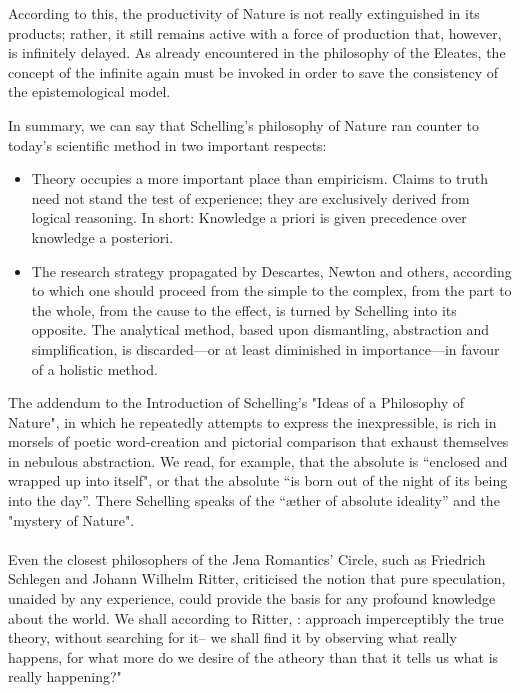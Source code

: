 \documentclass[10pt,a4paper]{article}
\newcounter{theo}
\begin{document}
                According to this, the productivity of Nature is not really extinguished in its products; rather, it still remains active with a force of production that, however, is infinitely delayed. As already encountered in the philosophy of the Eleates, the concept of the infinite again must be invoked in order to save the consistency of the epistemological model.\cite{Kuppers2018-vv}
    
                In summary, we can say that Schelling's philosophy of Nature ran counter to today's scientific method in two important respects: 
                \begin{itemize}
                    \item Theory occupies a more important place than empiricism. Claims to truth need not stand the test of experience; they are exclusively derived from logical reasoning. In short: Knowledge a priori is given precedence over knowledge a posteriori.
                    \item The research strategy propagated by Descartes, Newton and others, according to which one should proceed from the simple to the complex, from the part to the whole, from the cause to the effect, is turned by Schelling into its opposite. The analytical method, based upon dismantling, abstraction and simplification, is discarded—or at least diminished in importance—in favour of a holistic method.
                \end{itemize}
                The addendum to the Introduction of Schelling's "Ideas of a Philosophy of Nature", in which he repeatedly attempts to express the inexpressible, is rich in morsels of poetic word-creation and pictorial comparison that exhaust themselves in nebulous abstraction. We read, for example, that the absolute is “enclosed and wrapped up into itself", or that the absolute “is born out of the night of its being into the day”. There Schelling speaks of the “æther of absolute ideality” and the "mystery of Nature".
                \\
                \\
                Even the closest philosophers of the Jena Romantics' Circle, such as Friedrich Schlegen and Johann Wilhelm Ritter, criticised the notion that pure speculation, unaided by any experience, could provide the basis for any profound knowledge about the world. We shall according to Ritter, : approach imperceptibly the true theory, without searching for it-- we shall find it by observing what really happens, for what more do we desire of the atheory than that it tells us what is really happening?"\cite{Kuppers2018-vv} 
    
\end{document}
